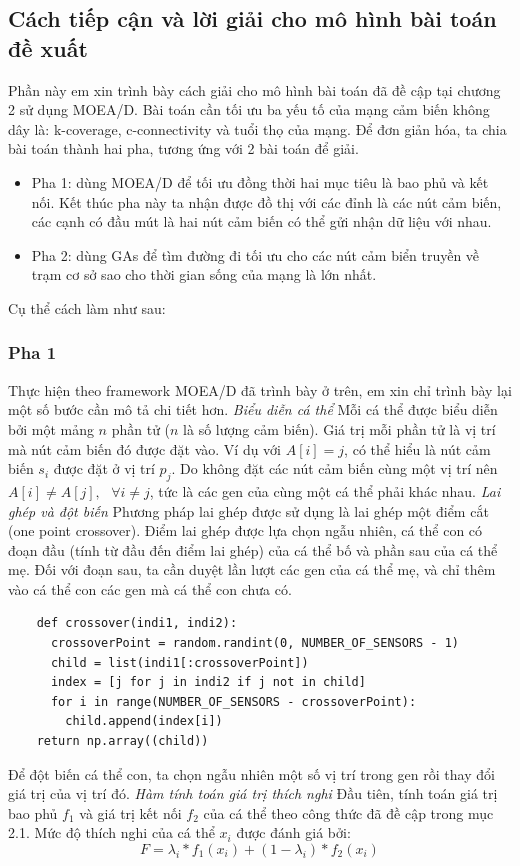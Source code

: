 \documentclass{article}
\begin{document}
\subsection{Cách tiếp cận và lời giải cho mô hình bài toán đề xuất}
Phần này em xin trình bày cách giải cho mô hình bài toán đã đề cập tại chương 2 sử dụng \gls{MOEA/D}. Bài toán cần tối ưu ba yếu tố của mạng cảm biến không dây là: k-coverage, c-connectivity và tuổi thọ của mạng. Để đơn giản hóa, ta chia bài toán thành hai pha, tương ứng với 2 bài toán để giải. 
\begin{itemize}
    \item Pha 1: dùng MOEA/D để tối ưu đồng thời hai mục tiêu là bao phủ và kết nối. Kết thúc pha này ta nhận được đồ thị với các đỉnh là các nút cảm biến, các cạnh có đầu mút là hai nút cảm biến có thể gửi nhận dữ liệu với nhau.
    \item Pha 2: dùng \gls{GAs} để tìm đường đi tối ưu cho các nút cảm biển truyền về trạm cơ sở sao cho thời gian sống của mạng là lớn nhất.
\end{itemize}
Cụ thể cách làm như sau:
\subsubsection{Pha 1}
Thực hiện theo framework \gls{MOEA/D} đã trình bày ở trên, em xin chỉ trình bày lại một số bước cần mô tả chi tiết hơn.
\newline \emph{Biểu diễn cá thể}
Mỗi cá thể được biểu diễn bởi một mảng $n$ phần tử ($n$ là số lượng cảm biến). Giá trị mỗi phần tử là vị trí mà nút cảm biến đó được đặt vào. Ví dụ với $A[i] = j$, có thể hiểu là nút cảm biến $s_i$ được đặt ở vị trí $p_j$. Do không đặt các nút cảm biến cùng một vị trí nên $A[i] \neq A[j], \text{ } \forall i \neq j$, tức là các gen của cùng một cá thể phải khác nhau.
\newline \emph{Lai ghép và đột biến}
Phương pháp lai ghép được sử dụng là lai ghép một điểm cắt (one point crossover). Điểm lai ghép được lựa chọn ngẫu nhiên, cá thể con có đoạn đầu (tính từ đầu đến điểm lai ghép) của cá thể bố và phần sau của cá thể mẹ. Đối với đoạn sau,  ta cần duyệt lần lượt các gen của cá thể mẹ, và chỉ thêm vào cá thể con các gen mà cá thể con chưa có.
\begin{lstlisting}
    def crossover(indi1, indi2):
      crossoverPoint = random.randint(0, NUMBER_OF_SENSORS - 1)
      child = list(indi1[:crossoverPoint])
      index = [j for j in indi2 if j not in child]
      for i in range(NUMBER_OF_SENSORS - crossoverPoint):
        child.append(index[i])
    return np.array((child))
\end{lstlisting}
Để đột biến cá thể con, ta chọn ngẫu nhiên một số vị trí trong gen rồi thay đổi giá trị của vị trí đó.
\newline \emph{Hàm tính toán giá trị thích nghi}
Đầu tiên, tính toán giá trị bao phủ $f_1$ và giá trị kết nối $f_2$ của cá thể theo công thức đã đề cập trong mục 2.1. Mức độ thích nghi của cá thể $x_i$ được đánh giá bởi:
\begin{equation}
    F = \lambda_i*f_1(x_i) + (1-\lambda_i)*f_2(x_i)
\end{equation}
\end{document}
